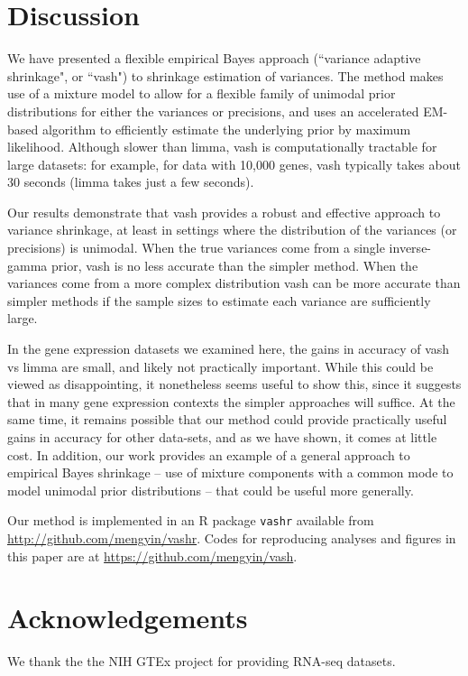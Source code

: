 \documentclass{bioinfo}
\begin{document}
\section{Discussion}

We have presented a flexible empirical Bayes approach (``variance adaptive shrinkage", or ``vash") 
to shrinkage estimation of variances. The method makes use of a mixture model to 
allow for a flexible family of unimodal prior distributions for either the variances or precisions, and uses an accelerated EM-based algorithm to efficiently 
estimate the underlying prior by maximum likelihood. Although slower than limma, vash is computationally tractable for large datasets: for example, for data with 10,000 genes, vash typically takes about 30 seconds (limma takes just a few seconds).

Our results demonstrate that vash provides a robust and effective approach to variance shrinkage, at least in settings where the distribution of the variances
(or precisions) is unimodal. When the true variances come from a single inverse-gamma prior, vash is no less accurate than the simpler method. When the 
variances come from a more complex distribution vash can be more accurate than simpler methods if the sample sizes to estimate each variance are sufficiently large.

In the gene expression datasets we examined here, the gains in accuracy of vash vs limma are small, and likely not practically important. While this could
be viewed as disappointing, it nonetheless seems useful to show this, since it suggests that in many gene expression contexts the simpler approaches will suffice.
At the same time, it remains possible that our method could provide practically useful gains in accuracy for other data-sets, and as we have shown, it comes at little cost.
In addition, our work provides an example of a general approach to empirical Bayes shrinkage -- use of mixture components with a common mode to model
unimodal prior distributions -- that could be useful more generally.

Our method is implemented in an R package \texttt{vashr} available from \href{http://github.com/mengyin/vashr}{http://github.com/mengyin/vashr}. Codes for reproducing analyses and figures in this paper are at \href{https://github.com/mengyin/vash}{https://github.com/mengyin/vash}.

\section*{Acknowledgements}
We thank the the NIH GTEx project for providing RNA-seq datasets. 
\end{document}
